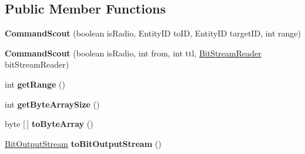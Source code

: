 \subsection*{Public Member Functions}
\begin{DoxyCompactItemize}
\item 
\hypertarget{classadf_1_1agent_1_1communication_1_1standard_1_1bundle_1_1centralized_1_1CommandScout_aff9ecd70669b3eb58531cd57c32d8555}{}\label{classadf_1_1agent_1_1communication_1_1standard_1_1bundle_1_1centralized_1_1CommandScout_aff9ecd70669b3eb58531cd57c32d8555} 
{\bfseries Command\+Scout} (boolean is\+Radio, Entity\+ID to\+ID, Entity\+ID target\+ID, int range)
\item 
\hypertarget{classadf_1_1agent_1_1communication_1_1standard_1_1bundle_1_1centralized_1_1CommandScout_ac9a91440db6b74364862aee281528f82}{}\label{classadf_1_1agent_1_1communication_1_1standard_1_1bundle_1_1centralized_1_1CommandScout_ac9a91440db6b74364862aee281528f82} 
{\bfseries Command\+Scout} (boolean is\+Radio, int from, int ttl, \hyperlink{classadf_1_1component_1_1communication_1_1util_1_1BitStreamReader}{Bit\+Stream\+Reader} bit\+Stream\+Reader)
\item 
\hypertarget{classadf_1_1agent_1_1communication_1_1standard_1_1bundle_1_1centralized_1_1CommandScout_ae77d422cb3e3fe1fffa6c80a8eb5e7c8}{}\label{classadf_1_1agent_1_1communication_1_1standard_1_1bundle_1_1centralized_1_1CommandScout_ae77d422cb3e3fe1fffa6c80a8eb5e7c8} 
int {\bfseries get\+Range} ()
\item 
\hypertarget{classadf_1_1agent_1_1communication_1_1standard_1_1bundle_1_1centralized_1_1CommandScout_a4627c3fe6e6d80533db053eba19a5f29}{}\label{classadf_1_1agent_1_1communication_1_1standard_1_1bundle_1_1centralized_1_1CommandScout_a4627c3fe6e6d80533db053eba19a5f29} 
int {\bfseries get\+Byte\+Array\+Size} ()
\item 
\hypertarget{classadf_1_1agent_1_1communication_1_1standard_1_1bundle_1_1centralized_1_1CommandScout_a68460d46dad6b559d17a70f08b2ec114}{}\label{classadf_1_1agent_1_1communication_1_1standard_1_1bundle_1_1centralized_1_1CommandScout_a68460d46dad6b559d17a70f08b2ec114} 
byte \mbox{[}$\,$\mbox{]} {\bfseries to\+Byte\+Array} ()
\item 
\hypertarget{classadf_1_1agent_1_1communication_1_1standard_1_1bundle_1_1centralized_1_1CommandScout_a02d53c2c9125cea7714fadf97b2614ba}{}\label{classadf_1_1agent_1_1communication_1_1standard_1_1bundle_1_1centralized_1_1CommandScout_a02d53c2c9125cea7714fadf97b2614ba} 
\hyperlink{classadf_1_1component_1_1communication_1_1util_1_1BitOutputStream}{Bit\+Output\+Stream} {\bfseries to\+Bit\+Output\+Stream} ()

\end{DoxyCompactItemize}
